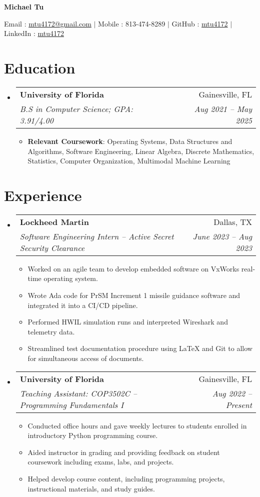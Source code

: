 \documentclass[letterpaper,11pt]{article}
\makeatletter
\newcommand{\resumeItem}[2]{
  \item\small{
    \textbf{#1}{: #2 \vspace{-2pt}}
  }
}
\newcommand{\resumeItemExperience}[1]{
  \item\small{
    {#1 \vspace{-2pt}}
  }
}
\newcommand{\resumeSubheading}[4]{
  \vspace{-1pt}\item
    \begin{tabular*}{0.97\textwidth}{l@{\extracolsep{\fill}}r}
      \textbf{#1} & #2 \\
      \textit{\small#3} & \textit{\small #4} \\
    \end{tabular*}\vspace{-6pt}
}
\newcommand{\resumeSubHeadingListStart}{\begin{itemize}[leftmargin=*, label={}]}
\newcommand{\resumeSubHeadingListEnd}{\end{itemize}}
\newcommand{\resumeItemListStart}{\begin{itemize}}
\newcommand{\resumeItemListEnd}{\end{itemize}\vspace{-5pt}}
\makeatother
\begin{document}
    \centerline{\textbf{\huge Michael Tu}}\vspace{0.15cm}
    \centerline{Email : \href{mailto:}{mtu4172@gmail.com} $|$
    Mobile : 813-474-8289 $|$
    GitHub : \href{http://github.com/mtu4172}{mtu4172} $|$
    LinkedIn : \href{http://linkedin.com/in/mtu4172}{mtu4172}}

\section{Education}
  \resumeSubHeadingListStart
    \resumeSubheading
      {University of Florida}{Gainesville, FL}
      {B.S in Computer Science; GPA: 3.91/4.00}{Aug 2021 -- May 2025}
    \resumeItemListStart
        \resumeItem{Relevant Coursework}
            {Operating Systems,
            Data Structures and Algorithms, 
            Software Engineering, 
            Linear Algebra, 
            Discrete Mathematics, 
            Statistics, 
            Computer Organization,
            Multimodal Machine Learning
            }
    \resumeItemListEnd
  \resumeSubHeadingListEnd

\section{Experience}
  \resumeSubHeadingListStart
    \resumeSubheading
      {Lockheed Martin}{Dallas, TX}
      {Software Engineering Intern -- Active Secret Security Clearance}{June 2023 -- Aug 2023}
      \resumeItemListStart
        \resumeItemExperience
          {Worked on an agile team to develop embedded software on VxWorks real-time operating system.}
        \resumeItemExperience
          {Wrote Ada code for PrSM Increment 1 missile guidance software and integrated it into a CI/CD pipeline.}
        \resumeItemExperience
          {Performed HWIL simulation runs and interpreted Wireshark and telemetry data.}
        \resumeItemExperience
          {Streamlined test documentation procedure using LaTeX and Git to allow for simultaneous access of documents.}
        \resumeItemListEnd
    \resumeSubheading
      {University of Florida}{Gainesville, FL}
      {Teaching Assistant: COP3502C -- Programming Fundamentals I}{Aug 2022 -- Present}
      \resumeItemListStart
        \resumeItemExperience
          {Conducted office hours and gave weekly lectures to students enrolled in introductory Python programming course.}
        \resumeItemExperience
          {Aided instructor in grading and providing feedback on student coursework including exams, labs, and projects.}
        \resumeItemExperience
          {Helped develop course content, including programming projects, instructional materials, and study guides.}
        \resumeItemListEnd
  \resumeSubHeadingListEnd
\end{document}
